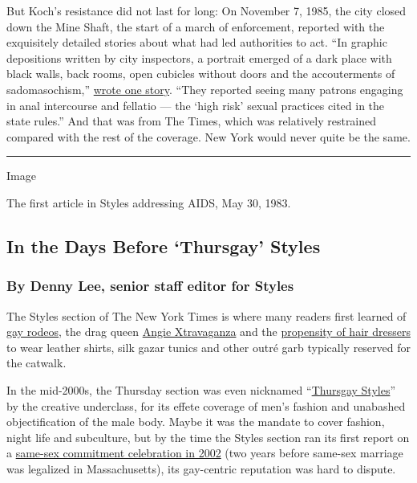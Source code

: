 But Koch's resistance did not last for long: On November 7, 1985, the
city closed down the Mine Shaft, the start of a march of enforcement,
reported with the exquisitely detailed stories about what had led
authorities to act. ``In graphic depositions written by city inspectors,
a portrait emerged of a dark place with black walls, back rooms, open
cubicles without doors and the accouterments of sadomasochism,''
\href{https://www.nytimes3xbfgragh.onion/1985/11/08/nyregion/city-closes-bar-frequented-by-homosexuals-citing-sexual-activity-linked-to-aids.html}{wrote
one story}. ``They reported seeing many patrons engaging in anal
intercourse and fellatio --- the `high risk' sexual practices cited in
the state rules.'' And that was from The Times, which was relatively
restrained compared with the rest of the coverage. New York would never
quite be the same.

\begin{center}\rule{0.5\linewidth}{\linethickness}\end{center}

Image

The first article in Styles addressing AIDS, May 30, 1983.

\hypertarget{in-the-days-before-thursgay-styles}{%
\subsection{In the Days Before `Thursgay'
Styles}\label{in-the-days-before-thursgay-styles}}

\hypertarget{by-denny-lee-senior-staff-editor-for-styles}{%
\subsubsection{By Denny Lee, senior staff editor for
Styles}\label{by-denny-lee-senior-staff-editor-for-styles}}

The Styles section of The New York Times is where many readers first
learned of
\href{https://www.nytimes3xbfgragh.onion/1993/09/26/style/bustin-stereotypes.html}{gay
rodeos}, the drag queen
\href{https://www.nytimes3xbfgragh.onion/1993/04/18/style/paris-has-burned.html}{Angie
Xtravaganza} and the
\href{https://www.nytimes3xbfgragh.onion/1996/11/24/style/right-off-the-runway-and-into-the-salon.html}{propensity
of hair dressers} to wear leather shirts, silk gazar tunics and other
outré garb typically reserved for the catwalk.

In the mid-2000s, the Thursday section was even nicknamed
``\href{http://gawker.com/210347/thursgay-styles-my-what-big-package-you-have}{Thursgay
Styles}'' by the creative underclass, for its effete coverage of men's
fashion and unabashed objectification of the male body. Maybe it was the
mandate to cover fashion, night life and subculture, but by the time the
Styles section ran its first report on a
\href{https://www.nytimes3xbfgragh.onion/2002/08/18/us/times-will-begin-reporting-gay-couples-ceremonies.html}{same-sex
commitment celebration in 2002} (two years before same-sex marriage was
legalized in Massachusetts), its gay-centric reputation was hard to
dispute.

